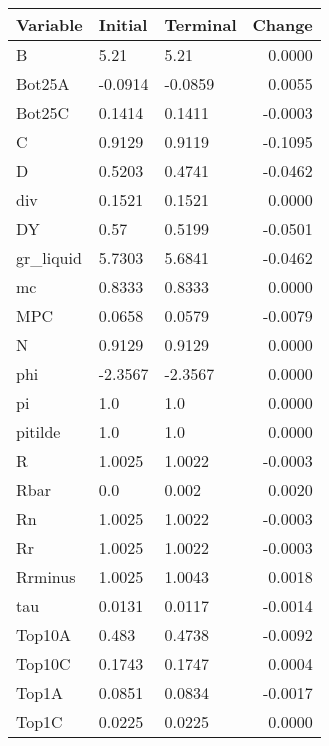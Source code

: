 \begin{table}
\centering
\label{tab:stst_comparison_low_beta_wedge_permanent}
\begin{tabular}{lllr}
\toprule
                Variable & Initial & Terminal &  Change \\
\midrule
                       B &    5.21 &     5.21 &  0.0000 \\
                  Bot25A & -0.0914 &  -0.0859 &  0.0055 \\
                  Bot25C &  0.1414 &   0.1411 & -0.0003 \\
                       C &  0.9129 &   0.9119 & -0.1095 \\
                       D &  0.5203 &   0.4741 & -0.0462 \\
                     div &  0.1521 &   0.1521 &  0.0000 \\
                      DY &    0.57 &   0.5199 & -0.0501 \\
               gr\_liquid &  5.7303 &   5.6841 & -0.0462 \\
                      mc &  0.8333 &   0.8333 &  0.0000 \\
                     MPC &  0.0658 &   0.0579 & -0.0079 \\
                       N &  0.9129 &   0.9129 &  0.0000 \\
                     phi & -2.3567 &  -2.3567 &  0.0000 \\
                      pi &     1.0 &      1.0 &  0.0000 \\
                 pitilde &     1.0 &      1.0 &  0.0000 \\
                       R &  1.0025 &   1.0022 & -0.0003 \\
                    Rbar &     0.0 &    0.002 &  0.0020 \\
                      Rn &  1.0025 &   1.0022 & -0.0003 \\
                      Rr &  1.0025 &   1.0022 & -0.0003 \\
                 Rrminus &  1.0025 &   1.0043 &  0.0018 \\
                     tau &  0.0131 &   0.0117 & -0.0014 \\
                  Top10A &   0.483 &   0.4738 & -0.0092 \\
                  Top10C &  0.1743 &   0.1747 &  0.0004 \\
                   Top1A &  0.0851 &   0.0834 & -0.0017 \\
                   Top1C &  0.0225 &   0.0225 &  0.0000 \\

\end{tabular}
\end{table}
